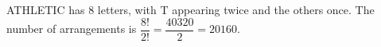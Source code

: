 ATHLETIC has $8$ letters, with T appearing twice and the others once. The number of arrangements is $\dfrac{8!}{2!}=\dfrac{40320}{2}=\boxed{20160}$.
